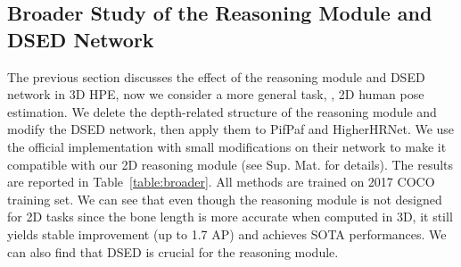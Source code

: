 \subsection{Broader Study of the Reasoning Module and DSED Network}
\label{sec:broaderStudy}
The previous section discusses the effect of the reasoning module and DSED network in 3D HPE, now we consider a more general task, \ie, 2D human pose estimation. We delete the depth-related structure of the reasoning module and modify the DSED network, then apply them to PifPaf and HigherHRNet. We use the official implementation with small modifications on their network to make it compatible with our 2D reasoning module (see Sup. Mat. for details). The results are reported in Table~\ref{table:broader}. All methods are trained on 2017 COCO training set. We can see that even though the reasoning module is not designed for 2D tasks since the bone length is more accurate when computed in 3D, it still yields stable improvement (up to 1.7 AP) and achieves SOTA performances. We can also find that DSED is crucial for the reasoning module. 

\begin{table}
    \setlength{\abovecaptionskip}{0.05cm}
    \setlength{\belowcaptionskip}{-0.15cm}
    \renewcommand\arraystretch{0.5}
    \renewcommand{\baselinestretch}{0.8}
    \small 
    \centering
    \caption{\textbf{Evaluation of occluded joint detection.} The left half compares the generated occlusion labels and the right half shows the model performance trained on these labels. For the left half, we randomly select 500 from 200k images in MuCo-3DHP and manually annotate them to get ground-truth labels.}
    \label{table:occL}
\end{table}

